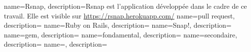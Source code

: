 {
 name=Rsnap,
 description={Rsnap est l'application développée dans le cadre de ce travail. Elle est visible sur \url{https://rsnap.herokuapp.com/}}
}
{
 name={pull request},
 description={}
}
{
 name={Ruby on Rails},
 description={}
}
{
 name={Snap!},
 description={}
}
{
 name={gem},
 description={}
}
{
 name={fondamental},
 description={}
}
{
 name={secondaire},
 description={}
}
\newglossaryentry{}
{
 name={},
 description={}
}
